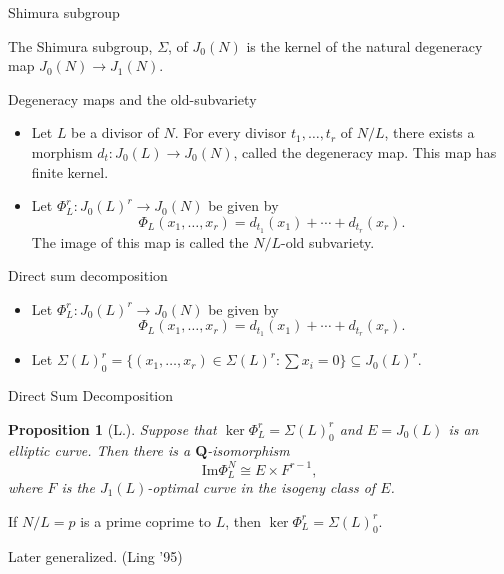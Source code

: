 \documentclass{beamer}
\newtheorem{proposition}[theorem]{Proposition}
\newcommand{\QQ}{\mathbf{Q}}
\renewcommand{\Im}{\mathrm{Im}}
\begin{document}
\begin{frame}{Shimura subgroup}
    \begin{definition}
        The Shimura subgroup, $\Sigma$, of $J_0(N)$ is the kernel of the
        natural degeneracy map $J_0(N)\to J_1(N)$.
    \end{definition}
\end{frame}

\begin{frame}{Degeneracy maps and the old-subvariety}
    \begin{itemize}
        \item
            Let $L$ be a divisor of $N$. For every divisor $t_1,\ldots,t_r$ of
            $N/L$, there exists a morphism $d_t:J_0(L)\to J_0(N)$, called the
            degeneracy map. This map has finite kernel.
        \item
            Let $\Phi_L ^r: J_0(L)^r \to J_0(N)$ be given by
            \[
                \Phi_L(x_1,\ldots,x_r)=d_{t_1}(x_1)+\cdots+d_{t_r}(x_r).
            \]
            The image of this map is called the $N/L$-old subvariety.
    \end{itemize}
\end{frame}

\begin{frame}{Direct sum decomposition}
    \begin{itemize}
        \item
            Let $\Phi_L ^r: J_0(L)^r \to J_0(N)$ be given by
            \[
                \Phi_L(x_1,\ldots,x_r)=d_{t_1}(x_1)+\cdots+d_{t_r}(x_r).
            \]
        \item
            Let $\Sigma(L)_0 ^r = \{(x_1,\ldots,x_r)\in \Sigma(L)^r: \sum
            x_i=0\}\subseteq J_0(L)^r$.
        \end{itemize}
\end{frame}

\begin{frame}{Direct Sum Decomposition}
    \begin{proposition}[L.]
        Suppose that $\ker\Phi_L ^r = \Sigma(L)_0 ^r$ and $E=J_0(L)$ is an elliptic
        curve. Then there is a $\QQ$-isomorphism
        \[
            \Im\Phi_L ^N \cong E \times F^{r-1},
        \]
        where $F$ is the $J_1(L)$-optimal curve in the isogeny class of $E$.
    \end{proposition}
    \begin{theorem}[Ribet '90]
        If $N/L=p$ is a prime coprime to $L$, then $\ker\Phi_L ^r = \Sigma(L)_0
        ^r$.
    \end{theorem}
    Later generalized. (Ling '95)
\end{frame}
\end{document}
